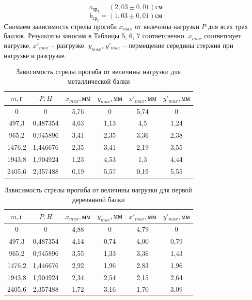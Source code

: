 \documentclass[a4paper,12pt]{article} %
\begin{document}
\[a_{\text{ср}_3} =(2,03\pm0,01)\text{см} \]
\[b_{\text{ср}_3} =(1,03\pm0,01)\text{см} \]
Снимаем зависимость стрелы прогиба $x_{max}$ от велечины нагрузки $P$  для всех трех баллок. Результаты заносим в Таблицы 5, 6, 7 соответсвенно. $x_{max}$ соответсвует нагрузке, $x'_{max}$ -- разгрузке. $y_{max}$, $y'_{max}$ -- пермещение середины стержня при нагрузке и разгрузке.
\begin{table}[h]
\centering
\begin{tabular}{|c|c|c|c|c|c|}
\hline
$m, \text{г}$   & $P,  H$    & $x_{max}, \text{мм}$ &  $y_{max}, \text{мм}$    & $x'_{max}, \text{мм}$ &    $y'_{max}, \text{мм}$  \\ \hline
   0    &  0        & 5,76              &   0   & 5,74               &    0  \\ \hline
497,3  & 0,487354  & 4,63              & 1,13 & 4,5                & 1,24 \\ \hline
965,2  & 0,945896  & 3,41              & 2,35 & 3,36               & 2,38 \\ \hline
1476,2 & 1,446676 & 2,35              & 3,41 & 2,19               & 3,55 \\ \hline
1943,8 & 1,904924 & 1,23              & 4,53 & 1,3                & 4,44 \\ \hline
2405,6 & 2,357488 & 0,19              & 5,57 & 0,19               & 5,55 \\ \hline
\end{tabular}
\caption{Зависимость стрелы прогиба от величины нагрузки для металлической балки}
\end{table}
\begin{table}[h]
\centering
\begin{tabular}{|c|c|c|c|c|c|}
\hline
$m, \text{г}$   & $P,  H$    & $x_{max}, \text{мм}$ &  $y_{max}, \text{мм}$    & $x'_{max}, \text{мм}$ &    $y'_{max}, \text{мм}$  \\ \hline
0      & 0        & 4,88 & 0    & 4,79 & 0    \\ \hline
497,3  & 0,487354  & 4,14 & 0,74 & 4,00  & 0,79 \\ \hline
965,2  & 0,945896  & 3,55 & 1,33 & 3,36 & 1,43 \\ \hline
1476,2 & 1,446676 & 2,92 & 1,96 & 2,83 & 1,96 \\ \hline
1943,8 & 1,904924 & 2,34 & 2,54 & 2,15 & 2,64 \\ \hline
2405,6 & 2,357488 & 1,72 & 3,16 & 1,70 & 3,09 \\ \hline
\end{tabular}
\caption{Зависимость стрелы прогиба от величины нагрузки для первой деревянной балки}
\end{table}
\end{document}
